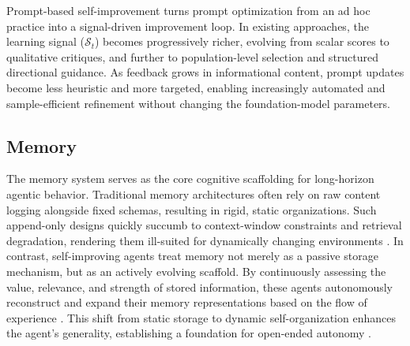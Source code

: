 \begin{ttcolorbox}[Takeaway]
Prompt-based self-improvement turns prompt optimization from an ad hoc practice into a signal-driven improvement loop. In existing approaches, the learning signal ($\mathcal{S}_t$) becomes progressively richer, evolving from scalar scores to qualitative critiques, and further to population-level selection and structured directional guidance. As feedback grows in informational content, prompt updates become less heuristic and more targeted, enabling increasingly automated and sample-efficient refinement without changing the foundation-model parameters.
\end{ttcolorbox}


\subsection{Memory}
\label{sec:Memory}

The memory system serves as the core cognitive scaffolding for long-horizon agentic behavior. Traditional memory architectures often rely on raw content logging alongside fixed schemas, resulting in rigid, static organizations. Such append-only designs quickly succumb to context-window constraints and retrieval degradation, rendering them ill-suited for dynamically changing environments \citep{modarressi2024retllmgeneralreadwritememory, he2024malmmmemoryaugmentedlargemultimodal, packer2024memgptllmsoperatingsystems}. In contrast, self-improving agents treat memory not merely as a passive storage mechanism, but as an actively evolving scaffold. By continuously assessing the value, relevance, and strength of stored information, these agents autonomously reconstruct and expand their memory representations based on the flow of experience \citep{du2025rethinkingmemoryaitaxonomy, xu2025sedm}. This shift from static storage to dynamic self-organization  enhances the agent's generality, establishing a foundation for open-ended autonomy \citep{xu2025amemagenticmemoryllm, sang2025pipelinessurveyparadigmshift, li2025memosmemoryosai}.

